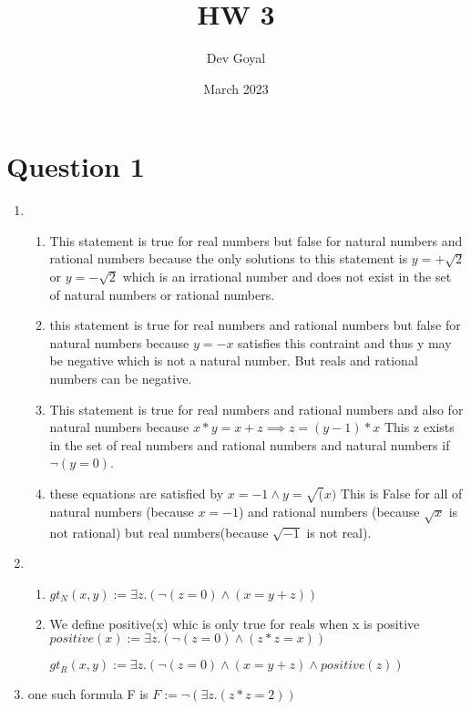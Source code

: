 \documentclass{article}
\title{HW 3}
\author{Dev Goyal}
\date{March 2023}
\begin{document}
\maketitle

\section{Question 1}
\begin{enumerate}[label=(\alph*)]
    \item \begin{enumerate}[label=(\roman*)]
        \item This statement is true for real numbers but false for natural numbers and rational numbers because the only solutions to this statement is $y = +\sqrt{2}$ or $y = -\sqrt{2}$ which is an irrational number and does not exist in the set of natural numbers or rational numbers.
        \item this statement is true for real numbers and rational numbers but false for natural numbers because $y = -x $ satisfies this contraint and thus y may be negative which is not a natural number. But reals and rational numbers can be negative.
        \item This statement is true for real numbers and rational numbers and also for natural numbers because $x*y = x + z \implies z = (y-1) * x$ This z exists in the set of real numbers and rational numbers and natural numbers if $\neg(y = 0)$.
        \item these equations are satisfied by $x = -1 \land y = \sqrt(x)$ This is False for all of natural numbers (because $x = -1$) and rational numbers (because $\sqrt{x}$ is not rational) but real numbers(because $\sqrt{-1}$ is not real).
    \end{enumerate}

    \item \begin{enumerate}[label=(\roman*)]
        \item $gt_{N} (x,y) := \exists z . (\neg(z = 0) \land (x = y + z))$
        \item We define positive(x) whic is only true for reals when x is positive
         $ positive(x) := \exists z . (\neg(z = 0) \land (z*z = x))$

         $gt_{R} (x,y) := \exists z . (\neg(z = 0) \land (x = y + z) \land positive(z))$
    \end{enumerate}

    \item one such formula F is $F := \neg (\exists z. (z * z = 2))$
\end{enumerate}
\end{document}
